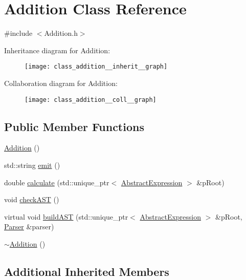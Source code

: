 \hypertarget{class_addition}{}\section{Addition Class Reference}
\label{class_addition}


{\ttfamily \#include $<$Addition.\+h$>$}



Inheritance diagram for Addition\+:
\nopagebreak
\begin{figure}[H]
\begin{center}
\leavevmode
\texttt{[image: class\_addition\_\_inherit\_\_graph]}
\end{center}
\end{figure}


Collaboration diagram for Addition\+:
\nopagebreak
\begin{figure}[H]
\begin{center}
\leavevmode
\texttt{[image: class\_addition\_\_coll\_\_graph]}
\end{center}
\end{figure}
\subsection*{Public Member Functions}
\begin{DoxyCompactItemize}
\item 
\mbox{\hyperlink{class_addition_a1e7555afe9d415aa65b528c04d8ab3a0}{Addition}} ()
\item 
std\+::string \mbox{\hyperlink{class_addition_a16f231380f84d361f2de34ab7d84093a}{emit}} ()
\item 
double \mbox{\hyperlink{class_addition_a162afcbf8cc7ecc74af2ad2291d0abbe}{calculate}} (std\+::unique\+\_\+ptr$<$ \mbox{\hyperlink{class_abstract_expression}{Abstract\+Expression}} $>$ \&p\+Root)
\item 
void \mbox{\hyperlink{class_addition_a2179a99b4b5cfe806c3ef67deac9bed4}{check\+A\+ST}} ()
\item 
virtual void \mbox{\hyperlink{class_addition_a5cd97a6e56814cfe24a1211aeaab907f}{build\+A\+ST}} (std\+::unique\+\_\+ptr$<$ \mbox{\hyperlink{class_abstract_expression}{Abstract\+Expression}} $>$ \&p\+Root, \mbox{\hyperlink{class_parser}{Parser}} \&parser)
\item 
\mbox{\hyperlink{class_addition_a66f0b31feefaaa51701e78b2a366b840}{$\sim$\+Addition}} ()
\end{DoxyCompactItemize}
\subsection*{Additional Inherited Members}


